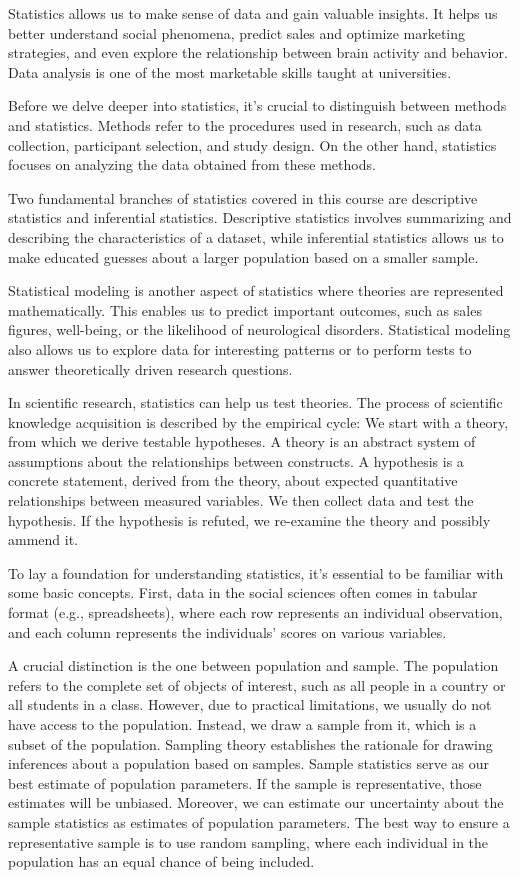 \documentclass[
  letterpaper,
]{scrbook}
\begin{document}
Statistics allows us to make sense of data and gain valuable insights.
It helps us better understand social phenomena, predict sales and
optimize marketing strategies, and even explore the relationship between
brain activity and behavior. Data analysis is one of the most marketable
skills taught at universities.

Before we delve deeper into statistics, it's crucial to distinguish
between methods and statistics. Methods refer to the procedures used in
research, such as data collection, participant selection, and study
design. On the other hand, statistics focuses on analyzing the data
obtained from these methods.

Two fundamental branches of statistics covered in this course are
descriptive statistics and inferential statistics. Descriptive
statistics involves summarizing and describing the characteristics of a
dataset, while inferential statistics allows us to make educated guesses
about a larger population based on a smaller sample.

Statistical modeling is another aspect of statistics where theories are
represented mathematically. This enables us to predict important
outcomes, such as sales figures, well-being, or the likelihood of
neurological disorders. Statistical modeling also allows us to explore
data for interesting patterns or to perform tests to answer
theoretically driven research questions.

In scientific research, statistics can help us test theories. The
process of scientific knowledge acquisition is described by the
empirical cycle: We start with a theory, from which we derive testable
hypotheses. A theory is an abstract system of assumptions about the
relationships between constructs. A hypothesis is a concrete statement,
derived from the theory, about expected quantitative relationships
between measured variables. We then collect data and test the
hypothesis. If the hypothesis is refuted, we re-examine the theory and
possibly ammend it.

To lay a foundation for understanding statistics, it's essential to be
familiar with some basic concepts. First, data in the social sciences
often comes in tabular format (e.g., spreadsheets), where each row
represents an individual observation, and each column represents the
individuals' scores on various variables.

A crucial distinction is the one between population and sample. The
population refers to the complete set of objects of interest, such as
all people in a country or all students in a class. However, due to
practical limitations, we usually do not have access to the population.
Instead, we draw a sample from it, which is a subset of the population.
Sampling theory establishes the rationale for drawing inferences about a
population based on samples. Sample statistics serve as our best
estimate of population parameters. If the sample is representative,
those estimates will be unbiased. Moreover, we can estimate our
uncertainty about the sample statistics as estimates of population
parameters. The best way to ensure a representative sample is to use
random sampling, where each individual in the population has an equal
chance of being included.
\end{document}
